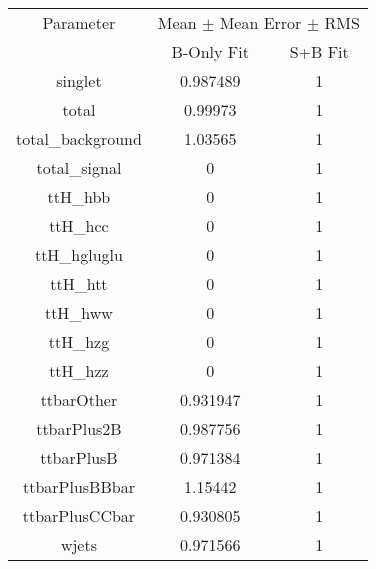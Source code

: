 \begin{table}
\centering

\begin{tabular}{ccc}
\toprule
Parameter & \multicolumn{2}{c}{Mean $\pm$ Mean Error $\pm$ RMS}\\
 & B-Only Fit & S+B Fit\\
\midrule
singlet & \num{0.987489} & \num{1}\\
total & \num{0.99973} & \num{1}\\
total\_background & \num{1.03565} & \num{1}\\
total\_signal & \num{0} & \num{1}\\
ttH\_hbb & \num{0} & \num{1}\\
ttH\_hcc & \num{0} & \num{1}\\
ttH\_hgluglu & \num{0} & \num{1}\\
ttH\_htt & \num{0} & \num{1}\\
ttH\_hww & \num{0} & \num{1}\\
ttH\_hzg & \num{0} & \num{1}\\
ttH\_hzz & \num{0} & \num{1}\\
ttbarOther & \num{0.931947} & \num{1}\\
ttbarPlus2B & \num{0.987756} & \num{1}\\
ttbarPlusB & \num{0.971384} & \num{1}\\
ttbarPlusBBbar & \num{1.15442} & \num{1}\\
ttbarPlusCCbar & \num{0.930805} & \num{1}\\
wjets & \num{0.971566} & \num{1}\\
\bottomrule
\end{tabular}
\end{table}